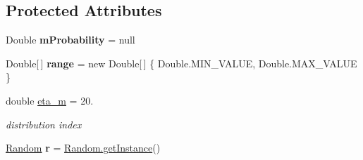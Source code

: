\subsection*{Protected Attributes}
\begin{DoxyCompactItemize}
\item 
\hypertarget{classcom_1_1msu_1_1moo_1_1operators_1_1mutation_1_1RealMutation_a94d80dbe78bc9cc04669c0b7291017a0}{Double {\bfseries m\-Probability} = null}\label{classcom_1_1msu_1_1moo_1_1operators_1_1mutation_1_1RealMutation_a94d80dbe78bc9cc04669c0b7291017a0}

\item 
\hypertarget{classcom_1_1msu_1_1moo_1_1operators_1_1mutation_1_1RealMutation_a4fc25fa76dc66e075085a391a3d239fc}{Double\mbox{[}$\,$\mbox{]} {\bfseries range} = new Double\mbox{[}$\,$\mbox{]} \{ Double.\-M\-I\-N\-\_\-\-V\-A\-L\-U\-E, Double.\-M\-A\-X\-\_\-\-V\-A\-L\-U\-E \}}\label{classcom_1_1msu_1_1moo_1_1operators_1_1mutation_1_1RealMutation_a4fc25fa76dc66e075085a391a3d239fc}

\item 
\hypertarget{classcom_1_1msu_1_1moo_1_1operators_1_1mutation_1_1RealMutation_ab6364b111e32f84e04360375bc1adeff}{double \hyperlink{classcom_1_1msu_1_1moo_1_1operators_1_1mutation_1_1RealMutation_ab6364b111e32f84e04360375bc1adeff}{eta\-\_\-m} = 20.}\label{classcom_1_1msu_1_1moo_1_1operators_1_1mutation_1_1RealMutation_ab6364b111e32f84e04360375bc1adeff}

\begin{DoxyCompactList}\small\item\em distribution index \end{DoxyCompactList}\item 
\hypertarget{classcom_1_1msu_1_1moo_1_1operators_1_1mutation_1_1RealMutation_ae0bad9fd2250042497a349e4f9b7de85}{\hyperlink{classcom_1_1msu_1_1moo_1_1util_1_1Random}{Random} {\bfseries r} = \hyperlink{classcom_1_1msu_1_1moo_1_1util_1_1Random_aaa20005ec38b5944262c79c06d92ab62}{Random.\-get\-Instance}()}\label{classcom_1_1msu_1_1moo_1_1operators_1_1mutation_1_1RealMutation_ae0bad9fd2250042497a349e4f9b7de85}

\end{DoxyCompactItemize}


